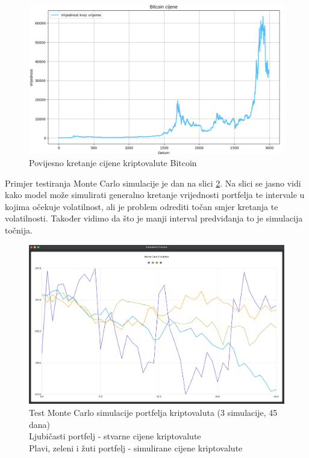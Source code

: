 \documentclass[zavrsnirad, upload]{fer}
\begin{document}
\begin{figure}[H]
    \centering
    \includegraphics[width=1.0\textwidth]{Figures/BTC_hist.png}
    \caption{Povijesno kretanje cijene kriptovalute Bitcoin}
    \label{fig:BTC_hist}
\end{figure}

Primjer testiranja Monte Carlo simulacije je dan na slici
\ref{fig:monte_carlo_test}.
Na slici se jasno vidi kako model može simulirati generalno kretanje
vrijednosti portfelja te intervale u kojima očekuje volatilnost, ali
je problem odrediti točan smjer kretanja te volatilnosti. Također vidimo
da što je manji interval predviđanja to je simulacija točnija.
\begin{figure}[H]
    \centering
    \includegraphics[width=1.0\textwidth]{Figures/monte_carlo_test.png}
    \caption{Test Monte Carlo simulacije portfelja kriptovaluta (3
    simulacije, 45 dana)\\
    Ljubičasti portfelj - stvarne cijene kriptovalute\\
    Plavi, zeleni i žuti portfelj - simulirane cijene kriptovalute
    }
    \label{fig:monte_carlo_test}
\end{figure}
\end{document}
